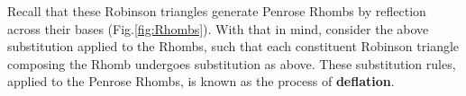\documentclass[
  oneside,
  11pt, a4paper,
  footinclude=true,
  headinclude=true,
  cleardoublepage=empty
]{scrbook}
\begin{document}
Recall that these Robinson triangles generate Penrose Rhombs by reflection across their bases (Fig.\ref{fig:Rhombs}). With that in mind, consider the above substitution applied to the Rhombs, such that each constituent Robinson triangle composing the Rhomb undergoes substitution as above. These substitution rules, applied to the Penrose Rhombs, is known as the process of \textbf{deflation}.

\begin{figure}[H]
        \centering
        \begin{subfigure}[t]{\textwidth}
        \begin{subfigure}[t]{0.4\textwidth}
                \centering
        \end{subfigure}\hfill \raisebox{75px}{\huge$\rightarrow$} \hfill%
        ~ %
        \begin{subfigure}[t]{0.4\textwidth}
                \centering

\end{subfigure}
\end{subfigure}
\end{figure}
\end{document}
